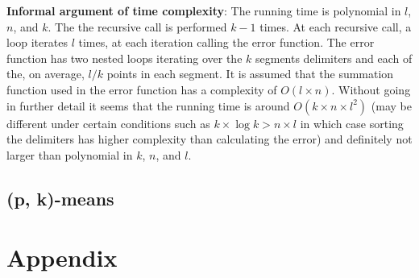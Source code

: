 \documentclass[11pt]{article}
\begin{document}
    \textbf{Informal argument of time complexity}: The running time is polynomial in $l$, $n$, and $k$. The the recursive call is performed $k-1$ times. At each recursive call, a loop iterates $l$ times, at each iteration calling the error function. The error function has two nested loops iterating over the $k$ segments delimiters and each of the, on average, $l/k$ points in each segment. It is assumed that the summation function used in the error function has a complexity of $O(l\times n)$. Without going in further detail it seems that the running time is around $O(k \times n \times l^2)$ (may be different under certain conditions such as $k \times \log k > n \times l$ in which case sorting the delimiters has higher complexity than calculating the error) and definitely not larger than polynomial in $k$, $n$, and $l$.
    

\subsection{(p, k)-means}

\section{Appendix}
\end{document}
